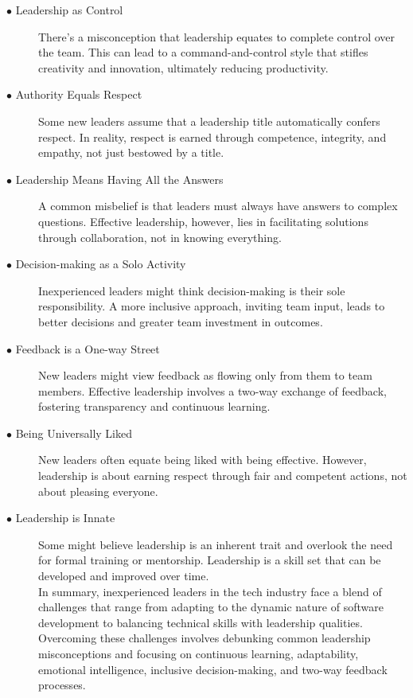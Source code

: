 \documentclass[runningheads]{llncs}
\begin{document}
\begin{description}

 \item [$\bullet$ Leadership as Control] There's a misconception that leadership equates to complete control over the team. This can lead to a command-and-control style that stifles creativity and innovation, ultimately reducing productivity.
  \\

 \item [$\bullet$ Authority Equals Respect] Some new leaders assume that a leadership title automatically confers respect. In reality, respect is earned through competence, integrity, and empathy, not just bestowed by a title.
  \\

 \item [$\bullet$ Leadership Means Having All the Answers] A common misbelief is that leaders must always have answers to complex questions. Effective leadership, however, lies in facilitating solutions through collaboration, not in knowing everything.
  \\

 \item [$\bullet$ Decision-making as a Solo Activity] Inexperienced leaders might think decision-making is their sole responsibility. A more inclusive approach, inviting team input, leads to better decisions and greater team investment in outcomes.
  \\

 \item [$\bullet$ Feedback is a One-way Street] New leaders might view feedback as flowing only from them to team members. Effective leadership involves a two-way exchange of feedback, fostering transparency and continuous learning.
  \\

 \item [$\bullet$ Being Universally Liked] New leaders often equate being liked with being effective. However, leadership is about earning respect through fair and competent actions, not about pleasing everyone.
  \\

 \item [$\bullet$ Leadership is Innate] Some might believe leadership is an inherent trait and overlook the need for formal training or mentorship. Leadership is a skill set that can be developed and improved over time.
  \\

In summary, inexperienced leaders in the tech industry face a blend of challenges that range from adapting to the dynamic nature of software development to balancing technical skills with leadership qualities. Overcoming these challenges involves debunking common leadership misconceptions and focusing on continuous learning, adaptability, emotional intelligence, inclusive decision-making, and two-way feedback processes.
  \\

\end{description}
\end{document}
